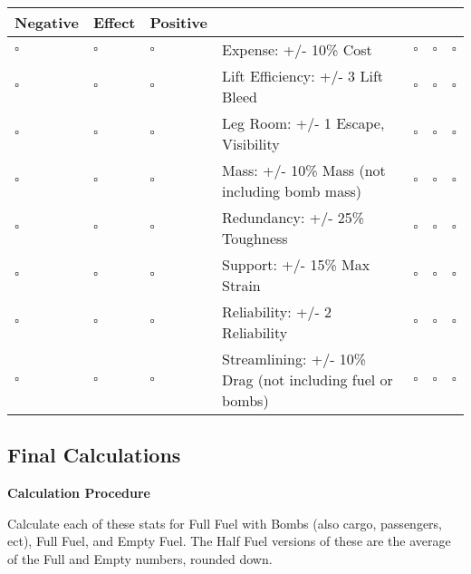 \documentclass{article}
\begin{document}
\begin{tabular}{|l|l|l|l|l|l|l|}
  \hline
  Negative    & \textbf{Effect} & Positive    &                                                           &             &             &             \\\hline
  $ \square $ & $ \square $     & $ \square $ & Expense: +/- 10\% Cost                                    & $ \square $ & $ \square $ & $ \square $ \\\hline
  $ \square $ & $ \square $     & $ \square $ & Lift Efficiency: +/- 3 Lift Bleed                         & $ \square $ & $ \square $ & $ \square $ \\\hline
  $ \square $ & $ \square $     & $ \square $ & Leg Room: +/- 1 Escape, Visibility                        & $ \square $ & $ \square $ & $ \square $ \\\hline
  $ \square $ & $ \square $     & $ \square $ & Mass: +/- 10\% Mass (not including bomb mass)             & $ \square $ & $ \square $ & $ \square $ \\\hline
  $ \square $ & $ \square $     & $ \square $ & Redundancy: +/- 25\% Toughness                            & $ \square $ & $ \square $ & $ \square $ \\\hline
  $ \square $ & $ \square $     & $ \square $ & Support: +/- 15\% Max Strain                              & $ \square $ & $ \square $ & $ \square $ \\\hline

  $ \square $ & $ \square $     & $ \square $ & Reliability: +/- 2 Reliability                            & $ \square $ & $ \square $ & $ \square $ \\\hline
  $ \square $ & $ \square $     & $ \square $ & Streamlining: +/- 10\% Drag (not including fuel or bombs) &
  $ \square $ & $ \square $     & $ \square $                                                                                                       \\\hline
\end{tabular}

\subsection{Final Calculations}
\label{_Final_Calculations}

\textbf{Calculation Procedure}

Calculate each of these stats for Full Fuel with Bombs (also cargo,
passengers, ect), Full Fuel, and Empty Fuel. The Half Fuel versions of
these are the average of the Full and Empty numbers, rounded down.
\end{document}
